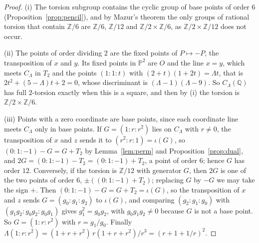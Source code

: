 \documentclass[11pt]{amsart}
\theoremstyle{definition}
\theoremstyle{remark}
\newcommand{\Q}{\mathbb{Q}}
\newcommand{\Z}{\mathbb{Z}}
\newcommand{\PP}{\mathbb{P}}
\begin{document}
\begin{proof}
(i) The torsion subgroup contains the cyclic group of base points of order $6$ (Proposition~\ref{prop:pencil}), and by Mazur's theorem \cite[Chap.~III, Thm~(5.1), p.~156]{mazur1977} the only groups of rational torsion that contain $\Z/6$ are $\Z/6$, $\Z/12$ and $\Z/2\times\Z/6$, as $\Z/2\times\Z/12$ does not occur.

(ii) The points of order dividing $2$ are the fixed points of $P\mapsto-P$, the transposition of $x$ and $y$. Its fixed points in $\PP^2$ are $O$ and the line $x=y$, which meets $C_\Lambda$ in $T_2$ and the points $(1:1:t)$ with $(2+t)(1+2t)=\Lambda t$, that is $2t^2+(5-\Lambda)t+2=0$, whose discriminant is $(\Lambda-1)(\Lambda-9)$. So $C_\Lambda(\Q)$ has full $2$-torsion exactly when this is a square, and then by (i) the torsion is $\Z/2\times\Z/6$.

(iii) Points with a zero coordinate are base points, since each coordinate line meets $C_\Lambda$ only in base points. If $G=(1:r:r^2)$ lies on $C_\Lambda$ with $r\ne0$, the transposition of $x$ and $z$ sends it to $(r^2:r:1)=\iota(G)$, so $(0:1:-1)-G=G+T_2$ by Lemma~\ref{lem:perm} and Proposition~\ref{prop:dual}, and $2G=(0:1:-1)-T_2=(0:1:-1)+T_2$, a point of order $6$; hence $G$ has order $12$. Conversely, if the torsion is $\Z/12$ with generator $G$, then $2G$ is one of the two points of order $6$, $\pm((0:1:-1)+T_2)$; replacing $G$ by $-G$ we may take the sign $+$. Then $(0:1:-1)-G=G+T_2=\iota(G)$, so the transposition of $x$ and $z$ sends $G=(g_0:g_1:g_2)$ to $\iota(G)$, and comparing $(g_2:g_1:g_0)$ with $(g_1g_2:g_0g_2:g_0g_1)$ gives $g_1^2=g_0g_2$, with $g_0g_1g_2\ne0$ because $G$ is not a base point. So $G=(1:r:r^2)$ with $r=g_1/g_0$. Finally $\Lambda(1:r:r^2)=(1+r+r^2)\,r(1+r+r^2)/r^3=(r+1+1/r)^2$.


\end{proof}
\end{document}
